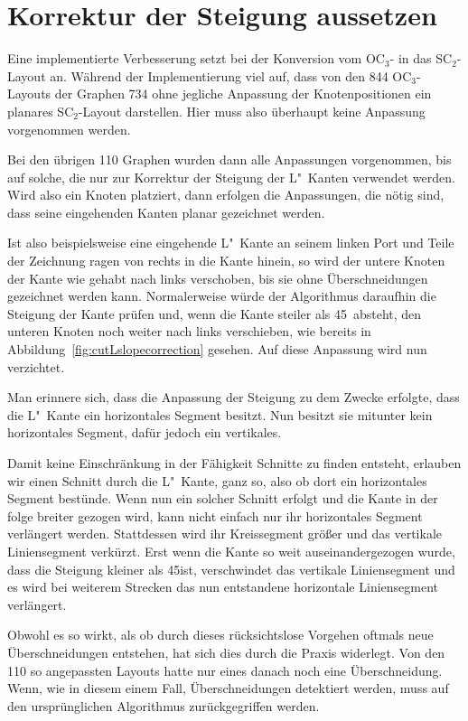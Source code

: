 \documentclass[a4paper]{scrreprt}
\theoremstyle{definition}
\begin{document}
\section{Korrektur der Steigung aussetzen}

Eine implementierte Verbesserung setzt bei der Konversion vom OC$_3$- in das SC$_2$-Layout an. Während der Implementierung viel auf, dass von den 844 OC$_3$-Layouts der Graphen 734 ohne jegliche Anpassung der Knotenpositionen ein planares SC$_2$-Layout darstellen. Hier muss also überhaupt keine Anpassung vorgenommen werden.

Bei den übrigen 110 Graphen wurden dann alle Anpassungen vorgenommen, bis auf solche, die nur zur Korrektur der Steigung der L"~Kanten verwendet werden. Wird also ein Knoten platziert, dann erfolgen die Anpassungen, die nötig sind, dass seine eingehenden Kanten planar gezeichnet werden.

Ist also beispielsweise eine eingehende L"~Kante an seinem linken Port und Teile der Zeichnung ragen von rechts in die Kante hinein, so wird der untere Knoten der Kante wie gehabt nach links verschoben, bis sie ohne Überschneidungen gezeichnet werden kann. Normalerweise würde der Algorithmus daraufhin die Steigung der Kante prüfen und, wenn die Kante steiler als 45\textdegree\ absteht, den unteren Knoten noch weiter nach links verschieben, wie bereits in Abbildung~\ref{fig:cutLslopecorrection} gesehen. Auf diese Anpassung wird nun verzichtet. 

Man erinnere sich, dass die Anpassung der Steigung zu dem Zwecke erfolgte, dass die L"~Kante ein horizontales Segment besitzt. Nun besitzt sie mitunter kein horizontales Segment, dafür jedoch ein vertikales.

Damit keine Einschränkung in der Fähigkeit Schnitte zu finden entsteht, erlauben wir einen Schnitt durch die L"~Kante, ganz so, also ob dort ein horizontales Segment bestünde. Wenn nun ein solcher Schnitt erfolgt und die Kante in der folge breiter gezogen wird, kann nicht einfach nur ihr horizontales Segment verlängert werden. Stattdessen wird ihr Kreissegment größer und das vertikale Liniensegment verkürzt. Erst wenn die Kante so weit auseinandergezogen wurde, dass die Steigung kleiner als 45\textdegree ist, verschwindet das vertikale Liniensegment und es wird bei weiterem Strecken das nun entstandene horizontale Liniensegment verlängert.

Obwohl es so wirkt, als ob durch dieses rücksichtslose Vorgehen oftmals neue Überschneidungen entstehen, hat sich dies durch die Praxis widerlegt. Von den 110 so angepassten Layouts hatte nur eines danach noch eine Überschneidung. Wenn, wie in diesem einem Fall, Überschneidungen detektiert werden, muss auf den ursprünglichen Algorithmus zurückgegriffen werden.
\end{document}
